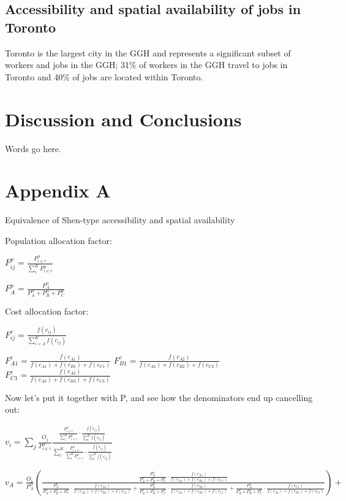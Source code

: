 \documentclass[]{elsarticle} %
\begin{document}
\hypertarget{accessibility-and-spatial-availability-of-jobs-in-toronto}{%
\subsection{Accessibility and spatial availability of jobs in
Toronto}\label{accessibility-and-spatial-availability-of-jobs-in-toronto}}

Toronto is the largest city in the GGH and represents a significant
subset of workers and jobs in the GGH; 31\% of workers in the GGH travel
to jobs in Toronto and 40\% of jobs are located within Toronto.

\newpage

\hypertarget{discussion-and-conclusions}{%
\section{Discussion and Conclusions}\label{discussion-and-conclusions}}

Words go here.

\hypertarget{appendix-a}{%
\section{Appendix A}\label{appendix-a}}

Equivalence of Shen-type accessibility and spatial availability

Population allocation factor:

\(F^p_{ij} = \frac{P_{i\in r}^\alpha}{\sum_{i}^K P_{i\in r}^\alpha}\)

\(F^p_{A} = \frac{P_{A}^\alpha}{P_{A}^\alpha + P_{B}^\alpha + P_{C}^\alpha}\)

Cost allocation factor:

\(F^c_{ij} = \frac{f(c_{ij})}{\sum_{i=A}^K f(c_{ij})}\)

\(F^c_{A1} = \frac{f(c_{A1})}{f(c_{A1})+f(c_{B1})+f(c_{C1})}\)
\(F^c_{B1} = \frac{f(c_{A2})}{f(c_{A2})+f(c_{B2})+f(c_{C2})}\)
\(F^c_{C1} = \frac{f(c_{A3})}{f(c_{A3})+f(c_{B3})+f(c_{C3})}\)

Now let's put it together with P, and see how the denominators end up
cancelling out:

\(v_{i} = \sum_{j}\frac{O_j}{P_{i\in r}^\alpha}\frac{\frac{P_{i\in r}^\alpha}{\sum_{i}^K P_{i\in r}^\alpha} \cdot \frac{f(c_{ij})}{\sum_{i}^K f(c_{ij})}}{\sum_{i}^K \frac{P_{i\in r}^\alpha}{\sum_{i}^K P_{i\in r}^\alpha} \cdot \frac{f(c_{ij})}{\sum_{i}^K f(c_{ij})}}\)

\(v_{A} = \frac{O_1}{P_{A}^\alpha}(\frac{\frac{P_{A}^\alpha}{P_{A}^\alpha+P_{B}^\alpha+P_{C}^\alpha} \cdot \frac{f(c_{A1})}{f(c_{A1})+f(c_{B1})+f(c_{C1})}}{\frac{P_{A}^\alpha}{P_{A}^\alpha+P_{B}^\alpha+P_{C}^\alpha} \cdot \frac{f(c_{A1})}{f(c_{A1})+f(c_{B1})+f(c_{C1})} + \frac{P_{A}^\alpha}{P_{A}^\alpha+P_{B}^\alpha+P_{C}^\alpha} \cdot \frac{f(c_{B1})}{f(c_{A1})+f(c_{B1})+f(c_{C1})}+ \frac{P_{A}^\alpha}{P_{A}^\alpha+P_{B}^\alpha+P_{C}^\alpha} \cdot \frac{f(c_{C1})}{f(c_{A1})+f(c_{B1})+f(c_{C1})}}) +\)
\end{document}
